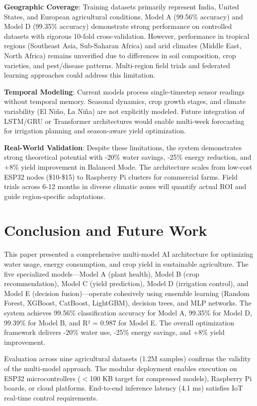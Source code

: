 \documentclass[conference]{IEEEtran}
\begin{document}
\textbf{Geographic Coverage}: Training datasets primarily represent India, United States, and European agricultural conditions. Model A (99.56\% accuracy) and Model D (99.35\% accuracy) demonstrate strong performance on controlled datasets with rigorous 10-fold cross-validation. However, performance in tropical regions (Southeast Asia, Sub-Saharan Africa) and arid climates (Middle East, North Africa) remains unverified due to differences in soil composition, crop varieties, and pest/disease patterns. Multi-region field trials and federated learning approaches could address this limitation.

\textbf{Temporal Modeling}: Current models process single-timestep sensor readings without temporal memory. Seasonal dynamics, crop growth stages, and climate variability (El Niño, La Niña) are not explicitly modeled. Future integration of LSTM/GRU or Transformer architectures would enable multi-week forecasting for irrigation planning and season-aware yield optimization.

\textbf{Real-World Validation}: Despite these limitations, the system demonstrates strong theoretical potential with -20\% water savings, -25\% energy reduction, and +8\% yield improvement in Balanced Mode. The architecture scales from low-cost ESP32 nodes (\$10-\$15) to Raspberry Pi clusters for commercial farms. Field trials across 6-12 months in diverse climatic zones will quantify actual ROI and guide region-specific adaptations.

\section{Conclusion and Future Work}

This paper presented a comprehensive multi-model AI architecture for optimizing water usage, energy consumption, and crop yield in sustainable agriculture. The five specialized models—Model A (plant health), Model B (crop recommendation), Model C (yield prediction), Model D (irrigation control), and Model E (decision fusion)—operate cohesively using ensemble learning (Random Forest, XGBoost, CatBoost, LightGBM), decision trees, and MLP networks. The system achieves 99.56\% classification accuracy for Model A, 99.35\% for Model D, 99.39\% for Model B, and R² = 0.987 for Model E. The overall optimization framework delivers -20\% water use, -25\% energy savings, and +8\% yield improvement.

Evaluation across nine agricultural datasets (1.2M samples) confirms the validity of the multi-model approach. The modular deployment enables execution on ESP32 microcontrollers ($<$100 KB target for compressed models), Raspberry Pi boards, or cloud platforms. End-to-end inference latency (4.1 ms) satisfies IoT real-time control requirements.
\end{document}
